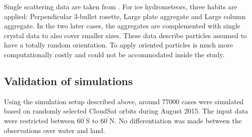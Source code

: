 \documentclass[12pt]{article}
\newcommand{\degree}{\ensuremath{\mathrm{^\circ}}}
\begin{document}
Single scattering data are taken from \citet{eriksson:agene:18}. For ice
hydrometeors, three habits are applied: Perpendicular 3-bullet rosette, Large
plate aggregate and Large column aggregate. In the two later cases, the
aggregates are complemented with single crystal data to also cover smaller
sizes. These data describe particles assumed to have a totally random
orientation. To apply oriented particles is much more computationally costly
and could not be accommodated inside the study.


\subsection{Validation of simulations}
%
Using the simulation setup described above, around 77000 cases were simulated
based on randomly selected CloudSat orbits during August 2015. The input data
were restricted between $60^{\degree}$S to $60^{\degree}$N. No differentiation
was made between the observations over water and land. 
\end{document}
